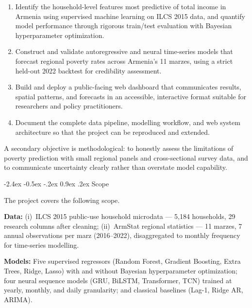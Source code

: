 \documentclass[12pt]{article}
\makeatletter
\renewcommand\subsection{%
  \@startsection{subsection}{2}{\z@}%
    {-2.4ex \@plus -0.5ex \@minus -.2ex}%
    {0.9ex \@plus .2ex}%
    {\color{steelblue}\normalsize\bfseries}}
\makeatother
\begin{document}
\begin{enumerate}[leftmargin=*, itemsep=0.3em]
  \item Identify the household-level features most predictive of total income in
        Armenia using supervised machine learning on ILCS 2015 data, and quantify
        model performance through rigorous train/test evaluation with Bayesian
        hyperparameter optimization.
  \item Construct and validate autoregressive and neural time-series models that
        forecast regional poverty rates across Armenia's 11 marzes, using a strict
        held-out 2022 backtest for credibility assessment.
  \item Build and deploy a public-facing web dashboard that communicates results,
        spatial patterns, and forecasts in an accessible, interactive format
        suitable for researchers and policy practitioners.
  \item Document the complete data pipeline, modelling workflow, and web system
        architecture so that the project can be reproduced and extended.
\end{enumerate}

\noindent A secondary objective is methodological: to honestly assess the
limitations of poverty prediction with small regional panels and cross-sectional
survey data, and to communicate uncertainty clearly rather than overstate model
capability.

\subsection{Scope}

\indent\hspace*{1em}
The project covers the following scope.

\vspace{0.4em}
\noindent\textbf{Data:}
(i)~ILCS 2015 public-use household microdata --- 5,184 households, 29 research
columns after cleaning; (ii)~ArmStat regional statistics --- 11 marzes,
7 annual observations per marz (2016--2022), disaggregated to monthly frequency
for time-series modelling.

\vspace{0.3em}
\noindent\textbf{Models:}
Five supervised regressors (Random Forest, Gradient Boosting, Extra Trees, Ridge,
Lasso) with and without Bayesian hyperparameter optimization; four neural sequence
models (GRU, BiLSTM, Transformer, TCN) trained at yearly, monthly, and daily
granularity; and classical baselines (Lag-1, Ridge AR, ARIMA).
\end{document}
